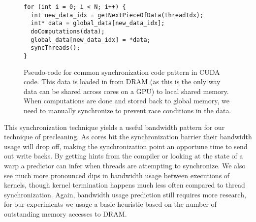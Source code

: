 \begin{figure}[htb]
\begin{center}

\begin{lstlisting}
for (int i = 0; i < N; i++) {
  int new_data_idx = getNextPieceOfData(threadIdx);
  int* data = global_data[new_data_idx];
  doComputations(data);
  global_data[new_data_idx] = *data;
  syncThreads();
}
\end{lstlisting}
\caption{Pseudo-code for common synchronization code pattern in CUDA code. This data is loaded in from DRAM (as this is the only way data can be shared across cores on a GPU) to local shared memory. When computations are done and stored back to global memory, we need to manually synchronize to prevent race conditions in the data.}
\label{f:cuda_sync}
\end{center}
\end{figure}
%


This synchronization technique yields a useful bandwidth pattern for our technique of precleaning. As cores hit the synchronization barrier their bandwidth usage will drop off, making the synchronization point an opportune time to send out write backs. By getting hints from the compiler or looking at the state of a warp a predictor can infer when threads are attempting to synchronize. We also see much more pronounced dips in bandwidth usage between executions of kernels, though kernel termination happens much less often compared to thread synchronization. Again, bandwidth usage prediction still requires more research, for our experiments we usage a basic heuristic based on the number of outstanding memory accesses to DRAM.
